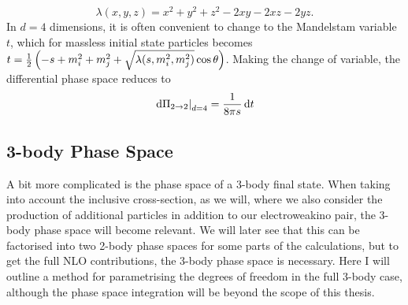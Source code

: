 \documentclass[../main.tex]{subfiles}
\begin{document}
\begin{equation}
  \label{pc:eq:kallen}
  \lambda(x, y, z) = x^2 + y^2 + z^2  - 2xy - 2xz - 2yz.
\end{equation}
In \(d=4\) dimensions, it is often convenient to change to the Mandelstam
variable \(t\), which for massless initial state particles becomes
\(t=\frac{1}{2}\left(-s+m_i^2+m_j^2+\sqrt{\lambda(s,m_i^2,m_j^2)}\cos\theta\right)\).
Making the change of variable, the differential phase space reduces to
\begin{equation}
  \label{pc:eq:dPi_dt}
  \left.\mathrm{d}\Pi_{2\to 2}\right|_{d=4} = \frac{1}{8\pi s} \,\mathrm{d}t
\end{equation}


\subsection{3-body Phase Space}
A bit more complicated is the phase space of a 3-body final state.
When taking into account the inclusive cross-section, as we will, where we also consider the production of additional particles in addition to our electroweakino pair, the 3-body phase space will become relevant.
We will later see that this can be factorised into two 2-body phase spaces for some parts of the calculations, but to get the full NLO contributions, the 3-body phase space is necessary.
Here I will outline a method for parametrising the degrees of freedom in the full 3-body case, although the phase space integration will be beyond the scope of this thesis.
\medskip
\end{document}

